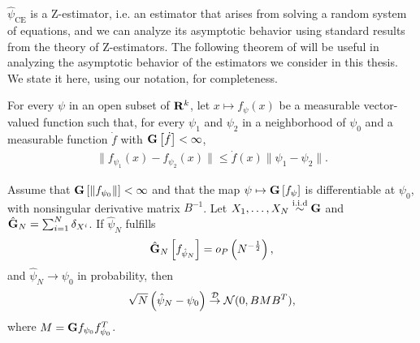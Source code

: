 $\hat\psi_{\text{CE}}$ is a Z-estimator, i.e. an estimator that arises from solving a random system of equations, and we can analyze its asymptotic behavior using standard results from the theory of Z-estimators. 
The following theorem of \citep{VanderVaart2000Asymptotic} will be useful in analyzing the asymptotic behavior of the estimators we consider in this thesis. We state it here, using our notation, for completeness.

\begin{theorem}
    \label{thm:clt_z_est_vdv}
    For every $\psi$ in an open subset of $\mathbf R^{k}$, let $x \mapsto f_{\psi}(x)$ be a measurable vector-valued function such that, for every $\psi_{1}$ and $\psi_{2}$ in a neighborhood of $\psi_{0}$ and a measurable function $\dot f$ with $\mathbf G \left[\dot f\right] < \infty$,
    \begin{align}
    \label{eq:clt-vdv-local-lipschitz}
    \lVert f_{\psi_{1}}(x) - f_{\psi_{2}}(x)\rVert \leq \dot f(x) \lVert \psi_{1} - \psi_{2}\rVert \tag{LL}.
    \end{align}

    Assume that $\mathbf G \left[\lVert f_{\psi_{0}}\rVert \right] < \infty$ and that the map $\psi \mapsto \mathbf G \left[f_{\psi}\right]$ is differentiable at $\psi_{0}$, with nonsingular derivative matrix $B^{-1}$. Let $X_{1}, \dots, X_{N} \stackrel{\text{i.i.d}}{\sim} \mathbf G$ and $\hat {\mathbf G}_{N} = \sum_{i = 1}^{N} \delta_{X^{i}}$. If $\hat\psi_{N}$ fulfills $$\hat{\mathbf G}_{N} \left[f_{\hat\psi_{N}}\right] = o_{P} \left( N^{-\frac{1}{2}} \right),$$ and $\hat\psi_{N} \to \psi_{0}$ in probability, then
    \begin{align}
        \label{eq:clt-vdv}
        \sqrt{N} \left( \hat\psi_{N} - \psi_{0} \right) \stackrel{\mathcal D}{\to} \mathcal N(0, BMB^{T}),
    \end{align}
    where $M = \mathbf G f_{\psi_{0}} f_{\psi_{0}}^{T}$.
\end{theorem}

